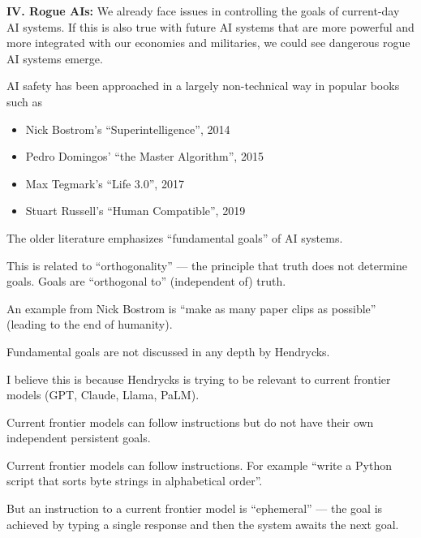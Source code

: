 {\vfill
{\bf IV. Rogue AIs:} We already face issues in controlling the goals of current-day AI systems. If this is also true with future AI systems that are more powerful and more integrated with our economies and militaries, we could see dangerous rogue AI systems emerge.


AI safety has been approached in a largely non-technical way in popular books such as

\vfill
\begin{itemize}
\item Nick Bostrom's ``Superintelligence'', 2014

\vfill
\item Pedro Domingos' ``the Master Algorithm'', 2015

\vfill
\item Max Tegmark's ``Life 3.0'', 2017

\vfill
\item Stuart Russell's ``Human Compatible'', 2019
\end{itemize}


The older literature emphasizes  ``fundamental goals'' of AI systems.

\vfill
This is related to ``orthogonality'' --- the principle that truth
does not determine goals.  Goals are ``orthogonal to'' (independent of) truth.

\vfill
An example from Nick Bostrom is ``make as many paper clips as possible'' (leading to the end of humanity).


Fundamental goals are not discussed in any depth by Hendrycks.

\vfill
I believe this is because Hendrycks is trying to be relevant to current frontier models (GPT, Claude, Llama, PaLM).

\vfill
Current frontier models can follow instructions but do not have their own independent persistent goals.


Current frontier models can follow instructions. For example ``write a Python script that sorts byte strings in alphabetical order''.

\vfill
But an instruction to a current frontier model is ``ephemeral'' --- the goal is achieved by typing a single response and then the system awaits the next goal.

}
